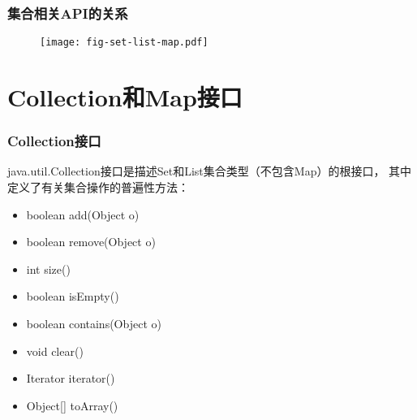 \begin{frame}[fragile] %
  \frametitle{集合相关API的关系}

  \begin{figure}
    \centering
    \texttt{[image: fig-set-list-map.pdf]}
  \end{figure}
\end{frame}


\section{Collection和Map接口}

\begin{frame}[fragile] %
  \frametitle{Collection接口}

  java.util.Collection接口是描述Set和List集合类型（不包含Map）的根接口，
  其中定义了有关集合操作的普遍性方法：
  
  \begin{itemize}[<+-| alert@+>]
  \item boolean add(Object o)\\
  \item boolean remove(Object o) \\
  \item int size()\\
  \item boolean isEmpty()\\
  \item boolean contains(Object o) \\
  \item void clear()\\
  \item Iterator iterator()\\
  \item Object[] toArray()\\
  \end{itemize}
\end{frame}

